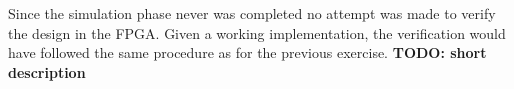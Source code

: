 Since the simulation phase never was completed no attempt was made to verify the design in the FPGA. Given a working implementation, the verification would have followed the same procedure as for the previous exercise. \textbf{TODO: short description}